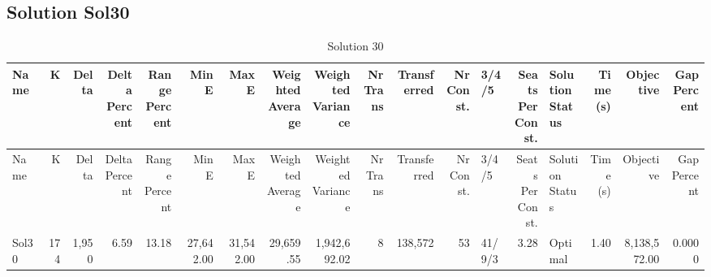 \documentclass[a4paper]{article}
\begin{document}
\clearpage
\subsection{Solution Sol30}

{\scriptsize
\begin{longtable}{lrrrrrrrrrrrlrlrrr}
\caption{Solution 30}
\\ \toprule
Name &K &Delta &\shortstack{Delta\\Percent} &\shortstack{Range\\Percent} &Min E &Max E &\shortstack{Weighted\\Average} &\shortstack{Weighted\\Variance} &\shortstack{Nr\\Trans} &Transferred &\shortstack{Nr\\Const.} &3/4/5 &\shortstack{Seats\\Per\\Const.} &\shortstack{Solution\\Status} &\shortstack{Time\\(s)} &Objective &\shortstack{Gap\\Percent} \\ \midrule
\endfirsthead
\toprule
Name &K &Delta &\shortstack{Delta\\Percent} &\shortstack{Range\\Percent} &Min E &Max E &\shortstack{Weighted\\Average} &\shortstack{Weighted\\Variance} &\shortstack{Nr\\Trans} &Transferred &\shortstack{Nr\\Const.} &3/4/5 &\shortstack{Seats\\Per\\Const.} &\shortstack{Solution\\Status} &\shortstack{Time\\(s)} &Objective &\shortstack{Gap\\Percent} \\ \midrule
\endhead
\bottomrule
\endfoot
Sol30&174&1,950& 6.59&13.18&27,642.00&31,542.00&29,659.55&1,942,692.02&8&138,572&53&41/9/3& 3.28&Optimal& 1.40&8,138,572.00&0.0000\\ 
\end{longtable}

}
\end{document}
